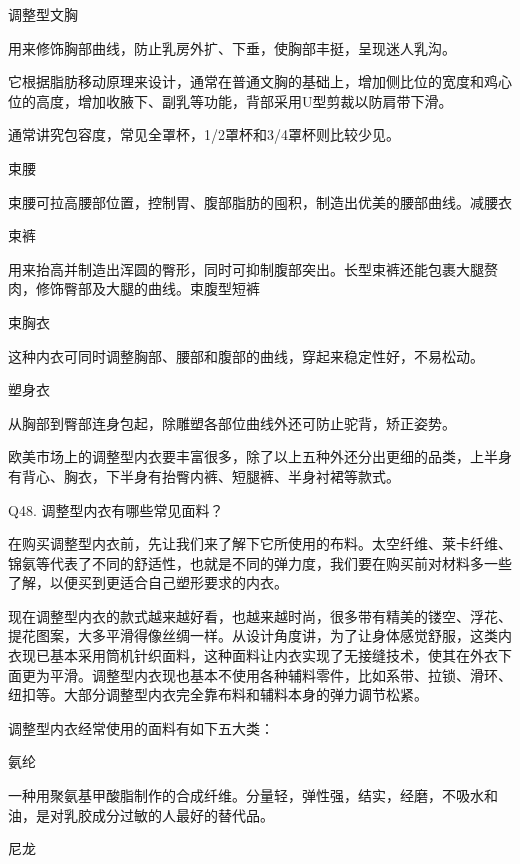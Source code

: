 \documentclass[12pt,UTF8]{ctexbook}
\begin{document}
调整型文胸

用来修饰胸部曲线，防止乳房外扩、下垂，使胸部丰挺，呈现迷人乳沟。



它根据脂肪移动原理来设计，通常在普通文胸的基础上，增加侧比位的宽度和鸡心位的高度，增加收腋下、副乳等功能，背部采用U型剪裁以防肩带下滑。

通常讲究包容度，常见全罩杯，1/2罩杯和3/4罩杯则比较少见。

束腰

束腰可拉高腰部位置，控制胃、腹部脂肪的囤积，制造出优美的腰部曲线。减腰衣



束裤

用来抬高并制造出浑圆的臀形，同时可抑制腹部突出。长型束裤还能包裹大腿赘肉，修饰臀部及大腿的曲线。束腹型短裤





束胸衣

这种内衣可同时调整胸部、腰部和腹部的曲线，穿起来稳定性好，不易松动。



塑身衣

从胸部到臀部连身包起，除雕塑各部位曲线外还可防止驼背，矫正姿势。



欧美市场上的调整型内衣要丰富很多，除了以上五种外还分出更细的品类，上半身有背心、胸衣，下半身有抬臀内裤、短腿裤、半身衬裙等款式。





Q48. 调整型内衣有哪些常见面料？


在购买调整型内衣前，先让我们来了解下它所使用的布料。太空纤维、莱卡纤维、锦氨等代表了不同的舒适性，也就是不同的弹力度，我们要在购买前对材料多一些了解，以便买到更适合自己塑形要求的内衣。

现在调整型内衣的款式越来越好看，也越来越时尚，很多带有精美的镂空、浮花、提花图案，大多平滑得像丝绸一样。从设计角度讲，为了让身体感觉舒服，这类内衣现已基本采用筒机针织面料，这种面料让内衣实现了无接缝技术，使其在外衣下面更为平滑。调整型内衣现也基本不使用各种辅料零件，比如系带、拉锁、滑环、纽扣等。大部分调整型内衣完全靠布料和辅料本身的弹力调节松紧。


调整型内衣经常使用的面料有如下五大类：

氨纶

一种用聚氨基甲酸脂制作的合成纤维。分量轻，弹性强，结实，经磨，不吸水和油，是对乳胶成分过敏的人最好的替代品。

尼龙
\end{document}
